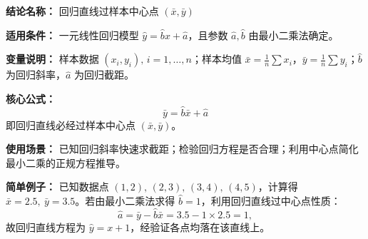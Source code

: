 \textbf{结论名称：} 回归直线过样本中心点 \((\bar{x},\bar{y})\)

\textbf{适用条件：} 一元线性回归模型 \(\hat{y} = \hat{b}x + \hat{a}\)，且参数 \(\hat{a},\hat{b}\) 由最小二乘法确定。

\textbf{变量说明：} 样本数据 \((x_i,y_i),\,i=1,\dots,n\)；样本均值 \(\bar{x}=\frac1n\sum x_i\)，\(\bar{y}=\frac1n\sum y_i\)；\(\hat{b}\) 为回归斜率，\(\hat{a}\) 为回归截距。

\textbf{核心公式：}
\[
\boxed{\bar{y} = \hat{b}\bar{x} + \hat{a}}
\]
即回归直线必经过样本中心点 \((\bar{x},\bar{y})\)。

\textbf{使用场景：} 已知回归斜率快速求截距；检验回归方程是否合理；利用中心点简化最小二乘的正规方程推导。

\textbf{简单例子：} 已知数据点 \((1,2),\,(2,3),\,(3,4),\,(4,5)\)，计算得 \(\bar{x}=2.5,\ \bar{y}=3.5\)。若由最小二乘法求得 \(\hat{b}=1\)，利用回归直线过中心点性质：
\[
\hat{a} = \bar{y} - \hat{b}\bar{x} = 3.5 - 1 \times 2.5 = 1,
\]
故回归直线方程为 \(\hat{y} = x + 1\)，经验证各点均落在该直线上。